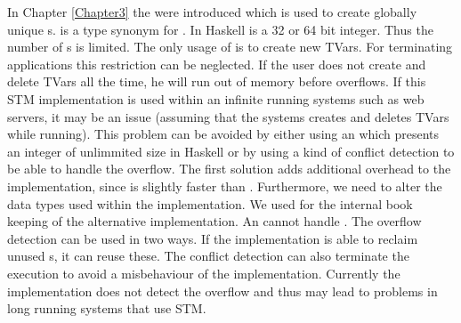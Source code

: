 In Chapter \ref{Chapter3} the  were introduced which is used to create globally unique 
s.  is a type synonym for . In Haskell  is a 32 or 64 bit integer. Thus 
the number of s is limited. The only usage of  is to create new TVars. For terminating 
applications this restriction can be neglected. If the user does not create and delete TVars all the time,
he will run out of memory before  overflows. If this STM implementation is used within an
infinite running systems such as web servers, it may be an issue (assuming that the systems creates and
deletes TVars while running). This problem can be avoided by either using an  which presents
an integer of unlimmited size in Haskell or by using a kind of conflict detection to be able to handle the 
overflow. The first solution adds additional overhead to the implementation, since  is slightly 
faster than . Furthermore, we need to alter the data types used within the implementation. 
We used  for the internal book keeping of the alternative implementation. An  cannot 
handle . The overflow detection can be used in two ways. If the implementation is able 
to reclaim unused s, it can reuse these. The conflict detection can also terminate the execution to 
avoid a misbehaviour of the implementation. Currently the implementation does not detect the overflow 
and thus may lead to problems in long running systems that use STM.

